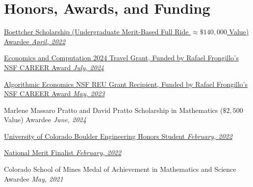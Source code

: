 \documentclass[a4paper,20pt]{article}
\begin{document}
    \vspace{-5pt}
    \section{Honors, Awards, and Funding}
    \begin{description}[font=$\bullet$]
    \item {\href{https://boettcherfoundation.org}{Boettcher Scholarship (Undergraduate Merit-Based Full Ride \(\approx\$140,000\) Value) Awardee \hfill \textit{April, 2022}}}
    \vspace{-5pt}
    \item {\href{https://www.colorado.edu/cs-theory/alg-econ}{Economics and Computation 2024 Travel Grant, Funded by Rafael Frongillo's NSF CAREER Award \hfill \textit{July, 2024}}}
    \vspace{-5pt}
    \item {\href{https://www.colorado.edu/cs-theory/alg-econ}{Algorithmic Economics NSF REU Grant Recipient, Funded by Rafael Frongillo's NSF CAREER Award \hfill \textit{May, 2023}}}
    \vspace{-5pt}
    \item {Marlene Massaro Pratto and David Pratto Scholarship in Mathematics (\(\$2,500\) Value) Awardee \hfill \textit{June, 2024}}
    \vspace{-5pt}
    \item {\href{https://cuengineeringhonors.com}{University of Colorado Boulder Engineering Honors Student \hfill \textit{February, 2022}}}
    \vspace{-5pt}
    \item {\href{https://www.nationalmerit.org}{National Merit Finalist \hfill \textit{February, 2022}}}
    \vspace{-5pt}
    \item {Colorado School of Mines Medal of Achievement in Mathematics and Science Awardee \hfill \textit{May, 2021}}
    \end{description}
    
\end{document}
